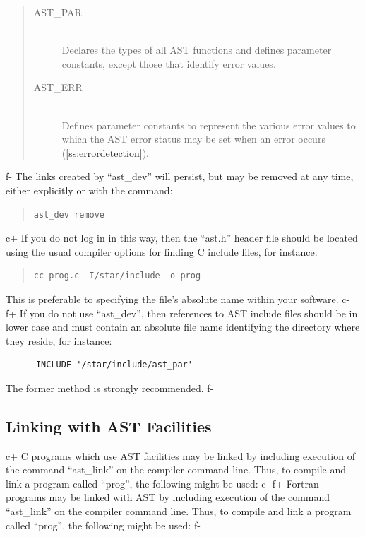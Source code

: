 \documentclass[twoside,11pt]{article}
\newcommand{\secref}[1]{\S\ref{#1}}
\renewcommand{\secref}[1]{\ref{#1}}
\begin{document}
\begin{quote}
\begin{description}
\item[AST\_PAR]\mbox{}\\
Declares the types of all AST functions and defines parameter
constants, except those that identify error values.

\item[AST\_ERR]\mbox{}\\
Defines parameter constants to represent the various error values to
which the AST error status may be set when an error occurs
(\secref{ss:errordetection}).
\end{description}
\end{quote}
f-
The links created by ``ast\_dev'' will persist, but may be removed at
any time, either explicitly or with the command:

\begin{quote}
\small
\begin{verbatim}
ast_dev remove
\end{verbatim}
\normalsize
\end{quote}

c+
If you do not log in in this way, then the ``ast.h'' header file
should be located using the usual compiler options for finding C
include files, for instance:

\begin{quote}
\small
\begin{verbatim}
cc prog.c -I/star/include -o prog
\end{verbatim}
\normalsize
\end{quote}

This is preferable to specifying the file's absolute name within your
software.
c-
f+
If you do not use ``ast\_dev'', then references to AST include files
should be in lower case and must contain an absolute file name
identifying the directory where they reside, for instance:

\small
\begin{verbatim}
      INCLUDE '/star/include/ast_par'
\end{verbatim}
\normalsize

The former method is strongly recommended.
f-

\subsection{\label{ss:linking}Linking with AST Facilities}

c+
C programs which use AST facilities may be linked by including
execution of the command ``ast\_link'' on the compiler command
line. Thus, to compile and link a program called ``prog'', the
following might be used:
c-
f+
Fortran programs may be linked with AST by including execution of the
command ``ast\_link'' on the compiler command line. Thus, to compile
and link a program called ``prog'', the following might be used:
f-
\end{document}
